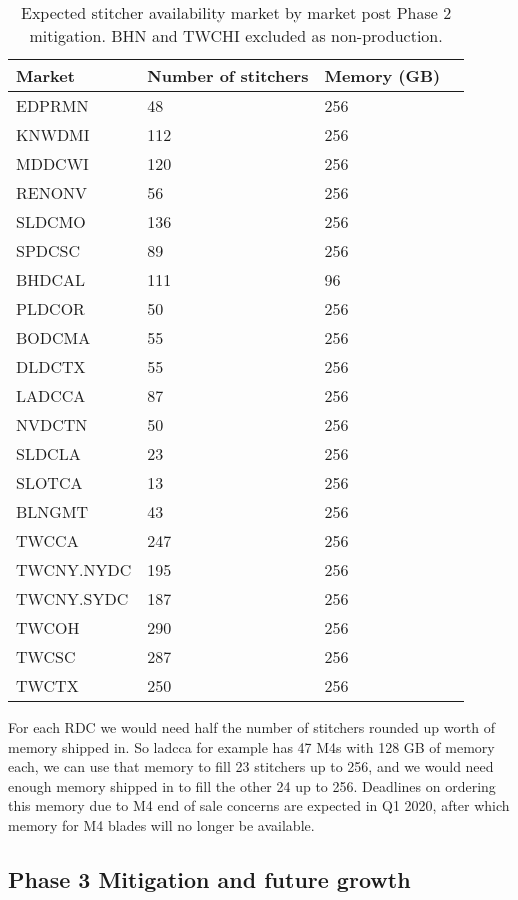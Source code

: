 \documentclass{article}
\begin{document}
\begin{table}
\begin{tabular}{|l|l|l|l|} 
\hline Market & Number of stitchers & Memory (GB)\\
\hline EDPRMN & 48 & 256\\
\hline KNWDMI & 112 & 256\\
\hline MDDCWI & 120 & 256\\
\hline RENONV & 56 & 256\\
\hline SLDCMO & 136 & 256\\
\hline SPDCSC & 89 & 256\\
\hline BHDCAL & 111 & 96\\
\hline PLDCOR & 50 & 256\\
\hline BODCMA & 55 & 256\\
\hline DLDCTX & 55 & 256\\
\hline LADCCA & 87 & 256\\
\hline NVDCTN & 50 & 256\\
\hline SLDCLA & 23 & 256\\
\hline SLOTCA & 13 & 256\\
\hline BLNGMT & 43 & 256\\
\hline TWCCA & 247 & 256\\
\hline TWCNY.NYDC & 195 & 256\\
\hline TWCNY.SYDC & 187 & 256\\
\hline TWCOH & 290 & 256\\
\hline TWCSC & 287 & 256\\
\hline TWCTX & 250 & 256\\
\hline 
\end{tabular}
\caption{\label{TABLE-marketStitcherAvailPhase2} Expected stitcher availability market by market post Phase 2 mitigation. BHN and TWCHI excluded as non-production.} 
\end{table}

For each RDC we would need half the number of stitchers rounded up worth of memory shipped in. So ladcca for example has 47 M4s with 128 GB of memory each, we can use that memory to fill 23 stitchers up to 256, and we would need enough memory shipped in to fill the other 24 up to 256. Deadlines on ordering this memory due to M4 end of sale concerns are expected in Q1 2020, after which memory for M4 blades will no longer be available. 

\subsection{Phase 3 Mitigation and future growth}
\label{SECTION-Phase3}
\end{document}

